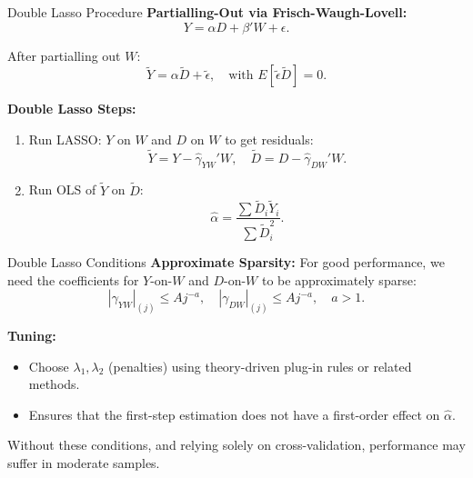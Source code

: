 \documentclass[xcolor=svgnames,t]{beamer}
\begin{document}
            
            \begin{frame}{Double Lasso Procedure}
            \textbf{Partialling-Out via Frisch-Waugh-Lovell:}  
            \[
            Y = \alpha D + \beta'W + \epsilon.
            \]
            
            \pause
            
            After partialling out $W$:
            \[
            \tilde{Y} = \alpha \tilde{D} + \tilde{\epsilon}, \quad \text{with } E[\tilde{\epsilon}\tilde{D}] = 0.
            \]
            
            \pause
            
            \textbf{Double Lasso Steps:}
            \begin{enumerate}
                \item Run LASSO: $Y$ on $W$ and $D$ on $W$ to get residuals:
                \[
                    \tilde{Y} = Y - \widehat{\gamma}_{YW}'W,\quad  \tilde{D} = D - \widehat{\gamma}_{DW}'W.
                \]
                \pause
                \item Run OLS of $\tilde{Y}$ on $ \tilde{D}$:
                \[
                \widehat{\alpha} = \frac{\sum  \tilde{D}_i \tilde{Y}_i}{\sum  \tilde{D}_i^2}.
                \]
            \end{enumerate}
            \end{frame}
            
            
            \begin{frame}{Double Lasso Conditions}
            \textbf{Approximate Sparsity:} For good performance, we need the coefficients for $Y$-on-$W$ and $D$-on-$W$ to be approximately sparse:
            \[
            | \gamma_{YW}|_{(j)} \leq A j^{-a}, \quad | \gamma_{DW}|_{(j)} \leq A j^{-a},\quad a>1.
            \]
            
            \pause
            
            \textbf{Tuning:} 
            \begin{itemize}
                \item Choose $\lambda_1, \lambda_2$ (penalties) using theory-driven plug-in rules or related methods.
                \pause
                \item Ensures that the first-step estimation does not have a first-order effect on $\widehat{\alpha}$.
            \end{itemize}
            
            \pause
            
            Without these conditions, and relying solely on cross-validation, performance may suffer in moderate samples.
            \end{frame}
            
\end{document}
